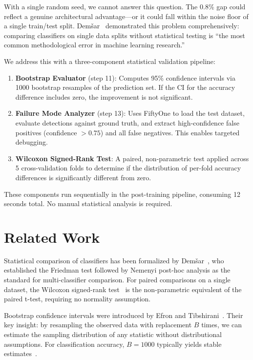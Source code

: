 \documentclass[10pt,twocolumn,letterpaper]{article}
\begin{document}
With a single random seed, we cannot answer this question. The 0.8\% gap could reflect a genuine architectural advantage---or it could fall within the noise floor of a single train/test split. Dem{\v{s}}ar~\cite{demsar2006statistical} demonstrated this problem comprehensively: comparing classifiers on single data splits without statistical testing is ``the most common methodological error in machine learning research.''

We address this with a three-component statistical validation pipeline:

\begin{enumerate}
    \item \textbf{Bootstrap Evaluator} (step 11): Computes 95\% confidence intervals via 1000 bootstrap resamples of the prediction set. If the CI for the accuracy difference includes zero, the improvement is not significant.
    \item \textbf{Failure Mode Analyzer} (step 13): Uses FiftyOne to load the test dataset, evaluate detections against ground truth, and extract high-confidence false positives (confidence $> 0.75$) and all false negatives. This enables targeted debugging.
    \item \textbf{Wilcoxon Signed-Rank Test}: A paired, non-parametric test applied across 5 cross-validation folds to determine if the distribution of per-fold accuracy differences is significantly different from zero.
\end{enumerate}

These components run sequentially in the post-training pipeline, consuming 12 seconds total. No manual statistical analysis is required.

\section{Related Work}
Statistical comparison of classifiers has been formalized by Dem{\v{s}}ar~\cite{demsar2006statistical}, who established the Friedman test followed by Nemenyi post-hoc analysis as the standard for multi-classifier comparison. For paired comparisons on a single dataset, the Wilcoxon signed-rank test~\cite{wilcoxon1945individual} is the non-parametric equivalent of the paired t-test, requiring no normality assumption.

Bootstrap confidence intervals were introduced by Efron and Tibshirani~\cite{efron1993introduction}. Their key insight: by resampling the observed data with replacement $B$ times, we can estimate the sampling distribution of any statistic without distributional assumptions. For classification accuracy, $B = 1000$ typically yields stable estimates~\cite{davison1997bootstrap}.
\end{document}
